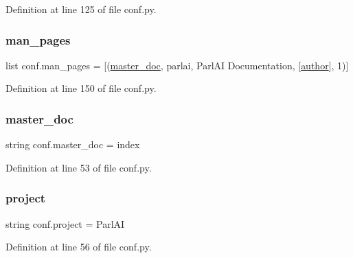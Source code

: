 Definition at line 125 of file conf.\+py.

\mbox{\label{namespaceconf_a85efc5fee48a26fa2d651f6eeb38fc2b}} 
\subsubsection{\texorpdfstring{man\+\_\+pages}{man\_pages}}
{\footnotesize\ttfamily list conf.\+man\+\_\+pages = \mbox{[}(\hyperlink{namespaceconf_a6fcd7e5236f355b1e1a55f9d95988810}{master\+\_\+doc}, \textquotesingle{}parlai\textquotesingle{}, \textquotesingle{}Parl\+AI Documentation\textquotesingle{}, \mbox{[}\hyperlink{namespaceconf_a637c239d256432248aa8d9f3ab0b8c52}{author}\mbox{]}, 1)\mbox{]}}



Definition at line 150 of file conf.\+py.

\mbox{\label{namespaceconf_a6fcd7e5236f355b1e1a55f9d95988810}} 
\subsubsection{\texorpdfstring{master\+\_\+doc}{master\_doc}}
{\footnotesize\ttfamily string conf.\+master\+\_\+doc = \textquotesingle{}index\textquotesingle{}}



Definition at line 53 of file conf.\+py.

\mbox{\label{namespaceconf_a45653c983098153b78e33600e39230eb}} 
\subsubsection{\texorpdfstring{project}{project}}
{\footnotesize\ttfamily string conf.\+project = \textquotesingle{}Parl\+AI\textquotesingle{}}



Definition at line 56 of file conf.\+py.

\mbox{\label{namespaceconf_a641130e096b26cba8a5d63ed38684de7}} 
